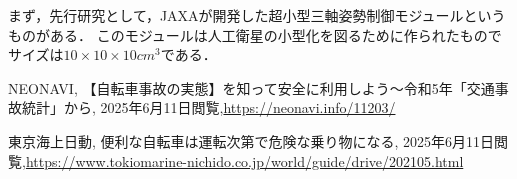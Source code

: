 \documentclass[uplatex]{jsarticle}
\begin{document}
まず，先行研究として，JAXAが開発した超小型三軸姿勢制御モジュールというものがある．
このモジュールは人工衛星の小型化を図るために作られたものでサイズは$10×10×10 {cm}^3$である．



\begin{thebibliography}{9}

 NEONAVI, 【自転車事故の実態】を知って安全に利用しよう～令和5年「交通事故統計」から, 
2025年6月11日閲覧,\url{https://neonavi.info/11203/}

 東京海上日動, 便利な自転車は運転次第で危険な乗り物になる, 
2025年6月11日閲覧,\url{https://www.tokiomarine-nichido.co.jp/world/guide/drive/202105.html}\end{thebibliography}
\end{document}
